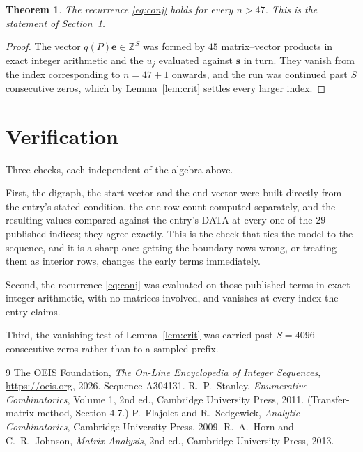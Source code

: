 \documentclass[11pt,a4paper]{article}
\theoremstyle{plain}
\newtheorem{theorem}{Theorem}
\theoremstyle{definition}
\begin{document}
\begin{theorem}
The recurrence \eqref{eq:conj} holds for every $n>47$. This is the statement of
Section~1.
\end{theorem}

\begin{proof}
The vector $q(P)\mathbf{e}\in\mathbb{Z}^{S}$ was formed by $45$ matrix--vector
products in exact integer arithmetic and the $u_j$ evaluated against $\mathbf{s}$ in turn.
They vanish from the index corresponding to $n=47+1$ onwards, and the run was continued
past $S$ consecutive zeros, which by Lemma~\ref{lem:crit} settles every larger index.
\end{proof}

\section{Verification}

Three checks, each independent of the algebra above.

First, the digraph, the start vector and the end vector were built directly from the
entry's stated condition, the one-row count computed separately, and the resulting values
compared against the entry's DATA at every one of the $29$ published indices; they
agree exactly. This is the check that ties the model to the sequence, and it is a sharp one:
getting the boundary rows wrong, or treating them as interior rows, changes the early terms
immediately.

Second, the recurrence \eqref{eq:conj} was evaluated on those published terms in exact
integer arithmetic, with no matrices involved, and vanishes at every index the entry claims.

Third, the vanishing test of Lemma~\ref{lem:crit} was carried past $S=4096$ consecutive
zeros rather than to a sampled prefix.

\begin{thebibliography}{9}
 The OEIS Foundation, \emph{The On-Line Encyclopedia of Integer
Sequences}, \url{https://oeis.org}, 2026. Sequence A304131.
 R.~P.~Stanley, \emph{Enumerative Combinatorics}, Volume 1, 2nd ed.,
Cambridge University Press, 2011. (Transfer-matrix method, Section 4.7.)
 P.~Flajolet and R.~Sedgewick, \emph{Analytic Combinatorics}, Cambridge
University Press, 2009.
 R.~A.~Horn and C.~R.~Johnson, \emph{Matrix Analysis}, 2nd ed., Cambridge
University Press, 2013.
\end{thebibliography}
\end{document}
